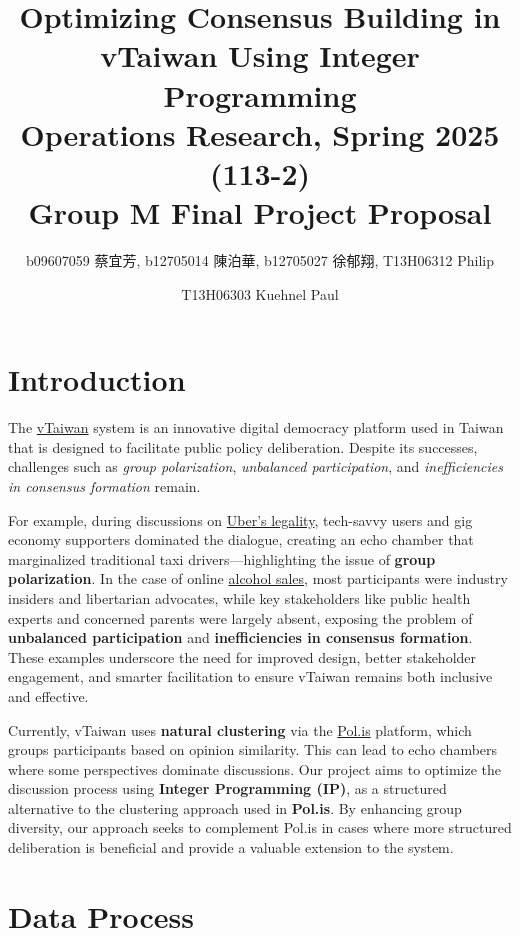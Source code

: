 \documentclass[11pt,a4paper]{article}
\title{Optimizing Consensus Building in vTaiwan Using Integer Programming \\ \large Operations Research, Spring 2025 (113-2) \\ Group M Final Project Proposal}
\author{b09607059 {\chinesefont 蔡宜芳}, b12705014 {\chinesefont 陳泊華}, b12705027 {\chinesefont 徐郁翔}, T13H06312 Philip}
\author{T13H06303 Kuehnel Paul}
\affil{Department of Information Management, National Taiwan University}
\begin{document}
\maketitle

\section{Introduction}
\label{sec-intro}

The \href{https://vtaiwan.tw}{vTaiwan} system is an innovative digital democracy platform used in Taiwan that is designed to facilitate public policy deliberation. Despite its successes, challenges such as \textit{group polarization}, \textit{unbalanced participation}, and \textit{inefficiencies in consensus formation} remain.  

For example, during discussions on \href{https://blog.pol.is/uber-responds-to-vtaiwans-coherent-blended-volition-3e9b75102b9b}{Uber’s legality}, tech-savvy users and gig economy supporters dominated the dialogue, creating an echo chamber that marginalized traditional taxi drivers—highlighting the issue of \textbf{group polarization}. In the case of online \href{https://www.technologyreview.com/2018/08/21/240284/the-simple-but-ingenious-system-taiwan-uses-to-crowdsource-its-laws/}{alcohol sales}, most participants were industry insiders and libertarian advocates, while key stakeholders like public health experts and concerned parents were largely absent, exposing the problem of \textbf{unbalanced participation} and \textbf{inefficiencies in consensus formation}. These examples underscore the need for improved design, better stakeholder engagement, and smarter facilitation to ensure vTaiwan remains both inclusive and effective.

Currently, vTaiwan uses \textbf{natural clustering} via the \href{https://pol.is/home}{Pol.is} platform, which groups participants based on opinion similarity. This can lead to echo chambers where some perspectives dominate discussions. 
Our project aims to optimize the discussion process using \textbf{Integer Programming (IP)}, as a structured alternative to the clustering approach used in \textbf{Pol.is}. By enhancing group diversity, our approach seeks to complement Pol.is in cases where more structured deliberation is beneficial and provide a valuable extension to the system. 

\section{Data Process}
\end{document}
